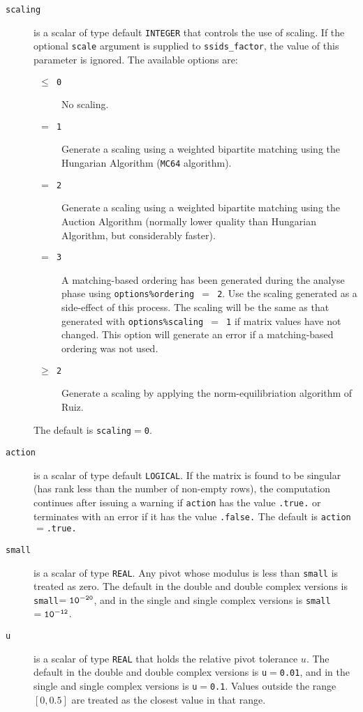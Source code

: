 \documentclass{spral}
\begin{document}
\begin{description}
\item[\texttt{scaling}] is a scalar of type default {\tt INTEGER} that controls
the use of scaling. If the optional {\tt scale} argument is supplied to
{\tt ssids\_factor}, the value of this parameter is ignored. The available
options are:
\begin{description}
   \item[\texttt{ $\le$ 0 }] No scaling.
   \item[\texttt{ $=$ 1 }] Generate a scaling using a weighted bipartite matching using
      the Hungarian Algorithm (\texttt{MC64} algorithm).
   \item[\texttt{ $=$ 2 }] Generate a scaling using a weighted bipartite matching using
      the Auction Algorithm (normally lower quality than Hungarian Algorithm, but considerably faster).
   \item[\texttt{ $=$ 3 }] A matching-based ordering has been generated during the
      analyse phase using {\tt options\%ordering $=$ 2}. Use the
      scaling generated as a side-effect of this process. The scaling will be
      the same as that generated with {\tt options\%scaling $=$ 1} if matrix
      values have not changed. This option will generate an error if a
      matching-based ordering was not used.
   \item[\texttt{ $\ge$ 2 }] Generate a scaling by applying the norm-equilibriation
      algorithm of Ruiz.
\end{description}
The default is {\tt scaling}$=${\tt 0}.

\end{description}


\begin{description}
\item[\texttt{action}] is a scalar of type default {\tt LOGICAL}.
If the matrix is found to be singular (has rank less than the number of
non-empty rows), the computation continues after issuing a warning if
{\tt action} has the value {\tt .true.} or
terminates with an error if it has the value {\tt .false.}
The default is {\tt action}$=${\tt .true.}

\item[\texttt{small}] is a scalar of type {\tt REAL}.
Any pivot whose modulus is less than {\tt small} is treated as zero.
The default in the double and double complex versions is
{\tt small}$ = {\tt 10^{-20}}$, and in the single and single complex versions
is {\tt small}$ = {\tt 10^{-12}}$.

\item[\texttt{u}] is a scalar of type {\tt REAL} that holds the relative pivot
tolerance $u$.
The default in the double and double complex versions is {\tt u}$=${\tt 0.01},
and in the single and single complex versions is {\tt u}$=${\tt 0.1}.
Values outside the range $[0,0.5]$ are treated as the closest value in that range.

\end{description}
\end{document}
